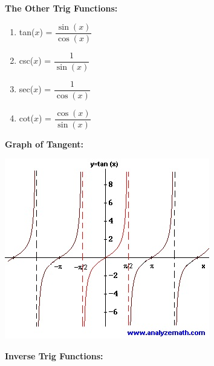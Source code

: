 \documentclass[12pt]{article}
\begin{document}
\textbf{The Other Trig Functions:}

\begin{enumerate}
\item tan($x$) = $\dfrac{\sin(x)}{\cos(x)}$
\item csc($x$) = $\dfrac{1}{\sin(x)}$
\item sec($x$) = $\dfrac{1}{\cos(x)}$
\item cot($x$) = $\dfrac{\cos(x)}{\sin(x)}$
\end{enumerate}

\newpage

\textbf{Graph of Tangent:}

\centerline{\includegraphics{TangentGraph.jpg}}

\textbf{Inverse Trig Functions:}
\end{document}
